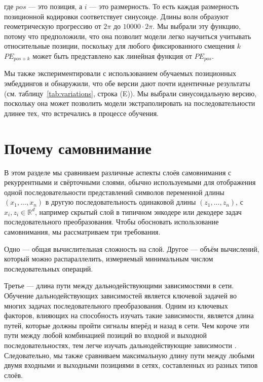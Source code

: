 \documentclass{article}
\begin{document}
где $pos$ — это позиция, а $i$ — это размерность. То есть каждая размерность позиционной кодировки соответствует синусоиде. Длины волн образуют геометрическую прогрессию от $2\pi$ до $10000 \cdot 2\pi$. Мы выбрали эту функцию, потому что предположили, что она позволит модели легко научиться учитывать относительные позиции, поскольку для любого фиксированного смещения $k$$PE_{pos+k}$ может быть представлено как линейная функция от $PE_{pos}$.

Мы также экспериментировали с использованием обучаемых позиционных эмбеддингов \citep{JonasFaceNet2017} и обнаружили, что обе версии дают почти идентичные результаты (см. таблицу~\ref{tab:variations}, строка (E)). Мы выбрали синусоидальную версию, поскольку она может позволить модели экстраполировать на последовательности длинее тех, что встречались в процессе обучения.

\section{Почему самовнимание}

В этом разделе мы сравниваем различные аспекты слоёв самовнимания с рекуррентными и свёрточными слоями, обычно используемыми для отображения одной последовательности представлений символов переменной длины $(x_1, ..., x_n)$ в другую последовательность одинаковой длины $(z_1, ..., z_n)$, с $x_i, z_i \in \mathbb{R}^d$, например скрытый слой в типичном энкодере или декодере задач последовательного преобразования. Чтобы обосновать использование самовнимания, мы рассматриваем три требования.

Одно — общая вычислительная сложность на слой.
Другое — объём вычислений, который можно распараллелить, измеряемый минимальным числом последовательных операций.

Третье — длина пути между дальнодействующими зависимостями в сети. Обучение дальнодействующих зависимостей является ключевой задачей во многих задачах последовательного преобразования. Одним из ключевых факторов, влияющих на способность изучать такие зависимости, является длина путей, которые должны пройти сигналы вперёд и назад в сети. Чем короче эти пути между любой комбинацией позиций во входной и выходной последовательностях, тем легче изучать дальнодействующие зависимости \citep{hochreiter2001gradient}. Следовательно, мы также сравниваем максимальную длину пути между любыми двумя входными и выходными позициями в сетях, составленных из разных типов слоёв.
\end{document}
